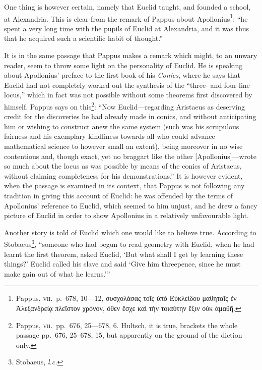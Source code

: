 One thing is however certain, namely that Euclid taught, and founded a school, at Alexandria. This is clear from the remark of Pappus about Apollonius\footnote{Pappus, \textsc{vii.}~p.~678, 10---12, συσχολάσας τοῖς ὑπὸ Εὐκλείδου μαθηταῖς ἐν Ἀλεξανδρείᾳ πλεῖστον χρόνον, ὅθεν ἔσχε καὶ τὴν τοιαύτην ἕξιν οὐκ ἀμαθῆ.}: ``he spent a very long time with the pupils of Euclid at Alexandria, and it was thus that he acquired such a scientific habit of thought.''

It is in the same passage that Pappus makes a remark which might, to an unwary reader, seem to throw some light on the personality of Euclid. He is speaking about Apollonius' preface to the first book of his \emph{Conics}, where he says that Euclid had not completely worked out the synthesis of the ``three- and four-line locus,'' which in fact was not possible without some theorems first discovered by himself. Pappus says on this\footnote{Pappus, \textsc{vii.}~pp.~676, 25---678, 6. Hultsch, it is true, brackets the whole passage pp.~676, 25--678, 15, but apparently on the ground of the diction only.}: ``Now Euclid---regarding Aristaeus as deserving credit for the discoveries he had already made in conics, and without anticipating him or wishing to construct anew the same system (such was his scrupulous fairness and his exemplary kindliness towards all who could advance mathematical science to however small an extent), being moreover in no wise contentious and, though exact, yet no braggart like the other [Apollonius]---wrote so much about the locus as was possible by means of the conics of Aristaeus, without claiming completeness for his demonstrations.'' It is however evident, when the passage is examined in its context, that Pappus is not following any tradition in giving this account of Euclid: he was offended by the terms of Apollonius' reference to Euclid, which seemed to him unjust, and he drew a fancy picture of Euclid in order to show Apollonius in a relatively unfavourable light.

Another story is told of Euclid which one would like to believe true. According to Stobaeus\footnote{Stobaeus, \emph{l.c.}}, ``someone who had begun to read geometry with Euclid, when he had learnt the first theorem, asked Euclid, `But what shall I get by learning these things?' Euclid called his slave and said `Give him threepence, since he must make gain out of what he learns.'\thinspace''


